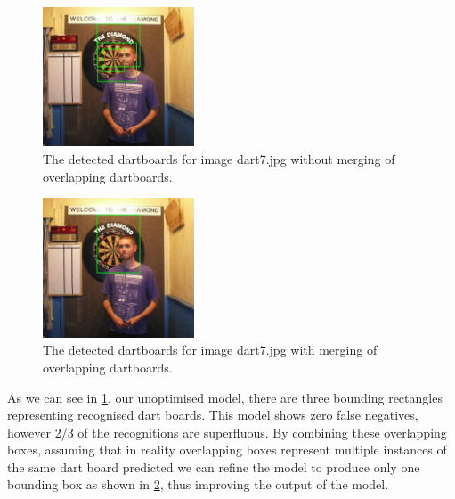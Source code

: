 \documentclass[conference]{IEEEtran}
\begin{document}
\begin{figure}[ht!]
	\centering
	\includegraphics[width=45mm]{img/Task4_Images/detected_dart7_unmerged.jpg}
	\caption{The detected dartboards for image dart7.jpg without merging of overlapping dartboards.}
	\label{Unmerged VJ-Hough}
\end{figure}

\begin{figure}[ht!]
	\centering
	\includegraphics[width=45mm]{img/Task4_Images/detected_dart7_merged.jpg}
	\caption{The detected dartboards for image dart7.jpg with merging of overlapping dartboards.}
	\label{Merged VJ-Hough}
\end{figure}

As we can see in \cref{Unmerged VJ-Hough}, our unoptimised model, there are three bounding rectangles representing recognised dart boards. This model shows zero false negatives, however 2/3 of the recognitions are superfluous. By combining these overlapping boxes, assuming that in reality overlapping boxes represent multiple instances of the same dart board predicted we can refine the model to produce only one bounding box as shown in \cref{Merged VJ-Hough}, thus improving the output of the model.
\end{document}
